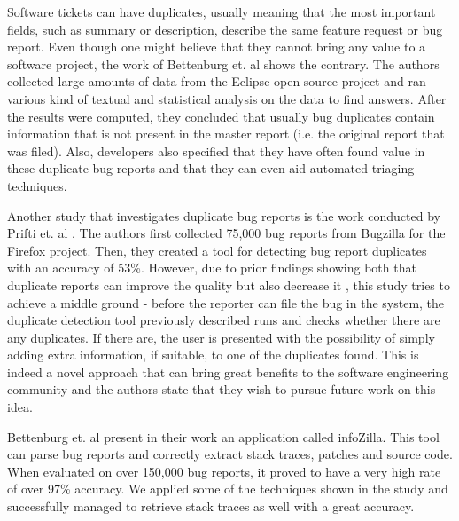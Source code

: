 \documentclass{mpaper}
\begin{document}
Software tickets can have duplicates, usually meaning that the most important fields, such 
as summary or description, describe the same feature request or bug report. Even though 
one might believe that they cannot bring any value to a software project, the work of 
Bettenburg et. al \cite{bettenburg2008duplicate} shows the contrary.
The authors collected large amounts of data from the Eclipse open source project and ran
various kind of textual and statistical analysis on the data to find answers.
After the results were computed, they concluded that usually bug duplicates contain 
information that is not present in the master report (i.e. the original report that was 
filed). Also, developers also specified that they have often found value in these 
duplicate bug reports and that they can even aid automated triaging techniques. 

Another study that investigates duplicate bug reports is the work conducted by Prifti et. al \cite{prifti2011detecting}. 
The authors first collected 75,000 bug reports from Bugzilla for the Firefox project. Then, they created a tool 
for detecting bug report duplicates with an accuracy of 53\%. However, due to prior 
findings showing both that duplicate reports can improve the quality \cite{bettenburg2008duplicate}
but also decrease it \cite{cavalcanti2013bug}, this study tries to achieve a middle ground - 
before the reporter can file the bug in the system, the duplicate detection tool previously 
described runs and checks whether there are any duplicates. If there are, the user is presented 
with the possibility of simply adding extra information, if suitable, to one of the duplicates 
found. This is indeed a novel approach that can bring great benefits to the software engineering 
community and the authors state that they wish to pursue future work on this idea.

Bettenburg et. al \cite{bettenburg2012using} present in their work an application
called infoZilla. This tool can
parse bug reports and correctly extract stack traces, patches and source code. 
When evaluated on over 150,000 bug reports, it proved to have a very high rate of over 97\% accuracy.
We applied some of the techniques shown in the study and successfully managed to 
retrieve stack traces as well with a great accuracy.
\end{document}
